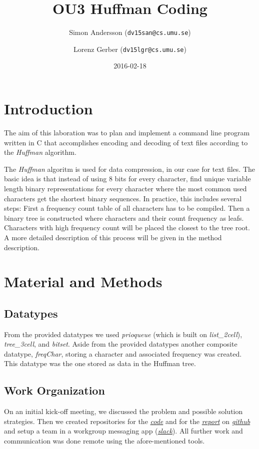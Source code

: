 \documentclass[a4paper,11pt,twoside]{article}
\title{OU3 Huffman Coding}
\author{Simon Andersson ({\tt{dv15san@cs.umu.se}})}
\author{Lorenz Gerber ({\tt{dv15lgr@cs.umu.se}})}
\date{2016-02-18}
\begin{document}
\lstset{language=C}
\maketitle
\thispagestyle{empty}

\tableofcontents
\newpage

\clearpage
{} 

\section{Introduction} 
The aim of this laboration was to plan and implement a command line
program written in C that accomplishes encoding and decoding of 
text files according to the \emph{Huffman} algorithm.

The \emph{Huffman} algoritm is used for data compression, in our case
for text files. The basic idea is that instead of using 8 bits for
every character, find unique variable length binary representations
for every character where the most common used characters get the
shortest binary sequences. In practice, this includes several steps:
First a frequency count table of all characters has to be
compiled. Then a binary tree is constructed where characters and their
count frequency as leafs. Characters with high frequency count will be
placed the closest to the tree root. A more detailed description of
this process will be given in the method description.



\section{Material and Methods}
\subsection{Datatypes}
From the provided datatypes we used \emph{prioqueue} (which is built on
\emph{list\_2cell}), \emph{tree\_3cell}, and \emph{bitset}. Aside from the provided 
datatypes another composite datatype, \emph{freqChar}, storing a character and associated frequency was
created. This datatype was the one stored as data in the Huffman tree.



\subsection{Work Organization}
On an initial kick-off meeting, we discussed the problem and possible
solution strategies. Then we created repositories for the 
\emph{\href{https://github.com/lorenzgerber/huffman}{code}} and for
the \emph{\href{https://github.com/lorenzgerber/report_huffman}{report}}
on \emph{\href{https://github.com}{github}} and setup a team in a 
workgroup messaging  app (\emph{\href{https://slack.com}{slack}}). All
further work and communication was done remote using the
afore-mentioned tools. 
\end{document}
